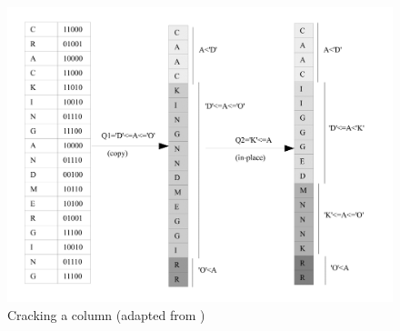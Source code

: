 \documentclass[10pt, conference, compsocconf]{IEEEtran}
\begin{document}
\begin{figure}[h]
\centering
\includegraphics[width=\columnwidth]{cracking.png}
\caption{Cracking a column (adapted from \cite{cracking})}
\end{figure}
\end{document}
